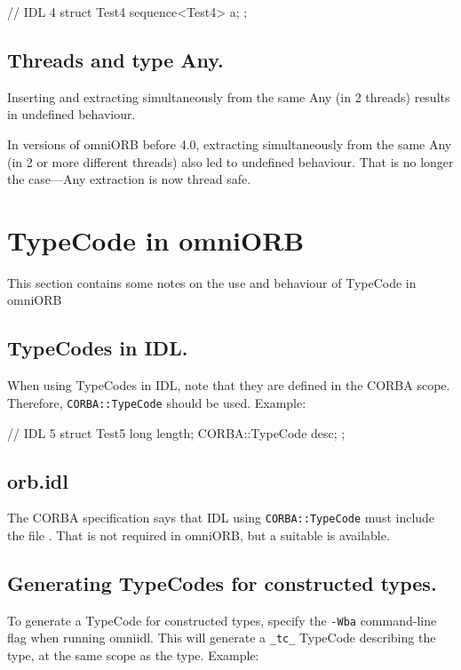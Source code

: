 \documentclass[11pt,twoside,a4paper]{book}
\newcommand{\type}[1]{\texttt{#1}}
\newcommand{\code}[1]{\texttt{#1}}
\newcommand{\file}{\begingroup \urlstyle{tt}\Url}
\begin{document}
\begin{idllisting}
// IDL 4
struct Test4 {
  sequence<Test4> a;
};
\end{idllisting}


\subsection{Threads and type Any.}
Inserting and extracting simultaneously from the same Any (in 2
threads) results in undefined behaviour.

In versions of omniORB before 4.0, extracting simultaneously from the
same Any (in 2 or more different threads) also led to undefined
behaviour. That is no longer the case---Any extraction is now thread
safe.


\section{TypeCode in omniORB}

This section contains some notes on the use and behaviour of TypeCode
in omniORB

\subsection{TypeCodes in IDL.}

When using TypeCodes in IDL, note that they are defined in the CORBA
scope.  Therefore, \type{CORBA::TypeCode} should be used. Example:

\begin{idllisting}
// IDL 5
struct Test5 {
  long length;
  CORBA::TypeCode desc;
};
\end{idllisting}

\subsection{orb.idl}

The CORBA specification says that IDL using \type{CORBA::TypeCode}
must include the file \file{orb.idl}. That is not required in omniORB,
but a suitable \file{orb.idl} is available.


\subsection{Generating TypeCodes for constructed types.}

To generate a TypeCode for constructed types, specify the
\texttt{-Wba} command-line flag when running omniidl. This will
generate a \code{\_tc\_} TypeCode describing the type, at the same
scope as the type. Example:
\end{document}
